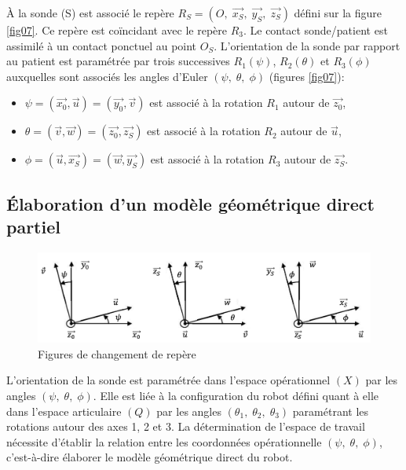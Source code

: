 À la sonde (S) est associé le repère $R_S=(O,\;\overrightarrow{x_S},\;\overrightarrow{y_S},\;\overrightarrow{z_S})$ défini sur la figure \ref{fig07}. 
Ce repère est coïncidant avec le repère $R_3$. Le contact sonde/patient est assimilé à un contact ponctuel au point $O_S$. L'orientation de la sonde par rapport au patient est paramétrée par trois successives $R_1(\psi)$, $R_2(\theta)$ et $R_3(\phi)$ auxquelles sont associés les angles d'Euler $(\psi,\;\theta,\;\phi) $ (figures \ref{fig07}):
\begin{itemize}
 \item $\psi=(\overrightarrow{x_0},\overrightarrow{u})=(\overrightarrow{y_0},\overrightarrow{v})$ est associé à la rotation $R_1$ autour de $\overrightarrow{z_0}$,
 \item $\theta=(\overrightarrow{v},\overrightarrow{w})=(\overrightarrow{z_0},\overrightarrow{z_S})$ est associé à la rotation $R_2$ autour de $\overrightarrow{u}$,
 \item $\phi=(\overrightarrow{u},\overrightarrow{x_S})=(\overrightarrow{w},\overrightarrow{y_S})$ est associé à la rotation $R_3$ autour de $\overrightarrow{z_S}$.
\end{itemize}

\subsection{Élaboration d'un modèle géométrique direct partiel}

\begin{figure}[ht!]
\begin{center}
 \includegraphics[width=0.9\linewidth]{img/fig08}
\end{center}
\caption{Figures de changement de repère}
\label{fig08}
\end{figure}

L'orientation de la sonde est paramétrée dans l'espace opérationnel $(X)$ par les angles $(\psi,\;\theta,\;\phi) $. Elle est liée à la configuration du robot défini quant à elle dans l'espace articulaire $(Q)$ par les angles $(\theta_1,\;\theta_2,\;\theta_3)$ paramétrant les rotations autour des axes 1, 2 et 3. La détermination de l'espace de travail nécessite d'établir la relation entre les coordonnées opérationnelle $(\psi,\;\theta,\;\phi) $, c'est-à-dire élaborer le modèle géométrique direct du robot.


